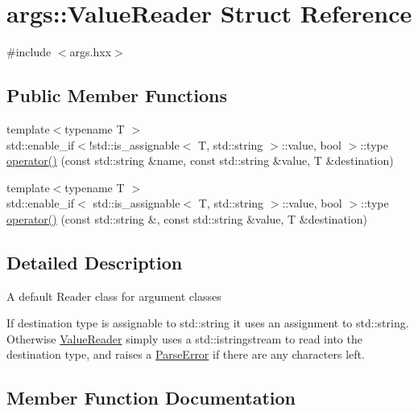 \hypertarget{structargs_1_1_value_reader}{}\section{args\+:\+:Value\+Reader Struct Reference}
\label{structargs_1_1_value_reader}


{\ttfamily \#include $<$args.\+hxx$>$}

\subsection*{Public Member Functions}
\begin{DoxyCompactItemize}
\item 
{\footnotesize template$<$typename T $>$ }\\std\+::enable\+\_\+if$<$!std\+::is\+\_\+assignable$<$ T, std\+::string $>$\+::value, bool $>$\+::type \hyperlink{structargs_1_1_value_reader_a9c1854f3823d9465a909680a6cc7dcca}{operator()} (const std\+::string \&name, const std\+::string \&value, T \&destination)
\item 
{\footnotesize template$<$typename T $>$ }\\std\+::enable\+\_\+if$<$ std\+::is\+\_\+assignable$<$ T, std\+::string $>$\+::value, bool $>$\+::type \hyperlink{structargs_1_1_value_reader_a6435ca3f4539456710e990ed5b96d0d1}{operator()} (const std\+::string \&, const std\+::string \&value, T \&destination)
\end{DoxyCompactItemize}


\subsection{Detailed Description}
A default Reader class for argument classes

If destination type is assignable to std\+::string it uses an assignment to std\+::string. Otherwise \hyperlink{structargs_1_1_value_reader}{Value\+Reader} simply uses a std\+::istringstream to read into the destination type, and raises a \hyperlink{classargs_1_1_parse_error}{Parse\+Error} if there are any characters left. 

\subsection{Member Function Documentation}
\mbox{\label{structargs_1_1_value_reader_a9c1854f3823d9465a909680a6cc7dcca}} 
